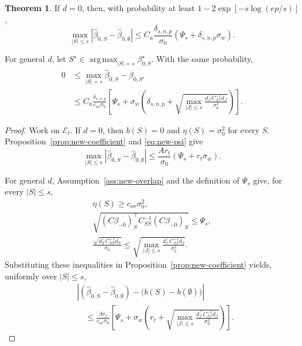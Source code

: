 \documentclass[a4paper,10pt,english]{article}
\theoremstyle{definition}
\newtheorem{theorem}[proposition]{Theorem}
\begin{document}
\begin{review}
\begin{theorem}
If \(d=0\), then, with probability at least
\(1-2\exp[-s\log(ep/s)]\),
\begin{equation}\label{eq:new-experimental}
 \max_{|S|\le s}
 |\hat\beta_{0,S}-\hat\beta_{0,\emptyset}|
 \le
 C_{\mathrm u}\frac{\delta_{s,n,p}}{\sigma_0}
 \left(\Psi_s+\delta_{s,n,p}\sigma_w\right).
\end{equation}

For general \(d\), let
\(S^\star\in\operatorname*{arg\,max}_{|S|=s}\beta^\star_{0,S}\).
With the same probability,
\begin{equation}\label{eq:new-observational}
 \begin{aligned}
 0
 &\le
 \max_{|S|=s}\hat\beta_{0,S}-\hat\beta_{0,S^\star}\\
 &\le
 C_{\mathrm u}\frac{\delta_{s,n,p}}{c_{\mathrm{ov}}\sigma_0}
 \left[
 \Psi_s+
 \sigma_w\left(
 \delta_{s,n,p}
 +\sqrt{
 \max_{|J|\le s}
 \frac{d_J^\top C_{JJ}^{-1}d_J}{\sigma_0^2}
 }
 \right)
 \right].
 \end{aligned}
\end{equation}
\end{theorem}

\begin{proof}
Work on \(\mathcal E_t\).
\rbreak
If \(d=0\), then \(b(S)=0\) and \(\eta(S)=\sigma_0^2\) for every \(S\).
\rbreak
Proposition~\ref{prop:new-coefficient} and \eqref{eq:new-psi} give
\begin{equation}\label{eq:new-experimental-radius}
 \max_{|S|\le s}
 |\hat\beta_{0,S}-\hat\beta_{0,\emptyset}|
 \le
 \frac{A r_t}{\sigma_0}
 \left(\Psi_s+r_t\sigma_w\right).
\end{equation}

For general \(d\), Assumption~\eqref{ass:new-overlap} and the definition
of \(\Psi_s\) give, for every \(|S|\le s\),
\[
 \begin{gathered}
 \eta(S)\ge c_{\mathrm{ov}}\sigma_0^2,\\
 \sqrt{(C\beta_{-0})_S^\top C_{SS}^{-1}(C\beta_{-0})_S}
 \le\Psi_s,\\
 \frac{\sqrt{d_S^\top C_{SS}^{-1}d_S}}{\sigma_0}
 \le
 \sqrt{
 \max_{|J|\le s}
 \frac{d_J^\top C_{JJ}^{-1}d_J}{\sigma_0^2}
 }.
 \end{gathered}
\]
\rbreak
Substituting these inequalities in
Proposition~\ref{prop:new-coefficient} yields, uniformly over \(|S|\le s\),
\begin{equation}\label{eq:new-observational-uniform}
 \begin{aligned}
 &\left|
 (\hat\beta_{0,S}-\hat\beta_{0,\emptyset})
 -\bigl(b(S)-b(\emptyset)\bigr)
 \right|\\
 &\quad\le
 \frac{A r_t}{c_{\mathrm{ov}}\sigma_0}
 \left[
 \Psi_s+
 \sigma_w\left(
 r_t+
 \sqrt{
 \max_{|J|\le s}
 \frac{d_J^\top C_{JJ}^{-1}d_J}{\sigma_0^2}
 }
 \right)
 \right].
 \end{aligned}
\end{equation}


\end{proof}
\end{review}
\end{document}
